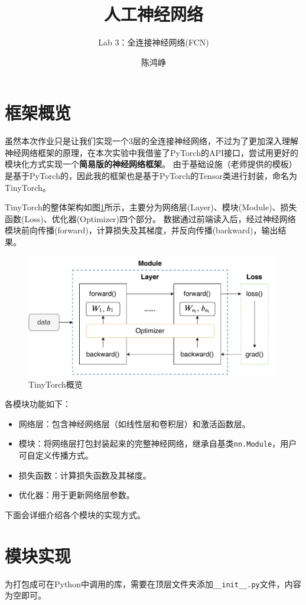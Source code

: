 \documentclass[logo,reportComp]{thesis}
\title{人工神经网络}
\subtitle{Lab 3：全连接神经网络(FCN)}
\author{陈鸿峥}
\begin{document}
\maketitle
\tableofcontents

\newpage

\section{框架概览}
虽然本次作业只是让我们实现一个3层的全连接神经网络，不过为了更加深入理解神经网络框架的原理，在本次实验中我借鉴了PyTorch的API接口，尝试用更好的模块化方式实现一个\textbf{简易版的神经网络框架}。
由于基础设施（老师提供的模板）是基于PyTorch的，因此我的框架也是基于PyTorch的Tensor类进行封装，命名为TinyTorch。

TinyTorch的整体架构如图\ref{fig:overview}所示，主要分为网络层(Layer)、模块(Module)、损失函数(Loss)、优化器(Optimizer)四个部分。
数据通过前端读入后，经过神经网络模块前向传播(forward)，计算损失及其梯度，并反向传播(backward)，输出结果。
\begin{figure}[H]
\centering
\includegraphics[width=0.7\linewidth]{fig/tinytorch.pdf}
\caption{TinyTorch概览}
\label{fig:overview}
\end{figure}

各模块功能如下：
\begin{itemize}
	\item 网络层：包含神经网络层（如线性层和卷积层）和激活函数层。
	\item 模块：将网络层打包封装起来的完整神经网络，继承自基类\verb'nn.Module'，用户可自定义传播方式。
	\item 损失函数：计算损失函数及其梯度。
	\item 优化器：用于更新网络层参数。
\end{itemize}

下面会详细介绍各个模块的实现方式。

\section{模块实现}
为打包成可在Python中调用的库，需要在顶层文件夹添加\verb'__init__.py'文件，内容为空即可。
\end{document}
